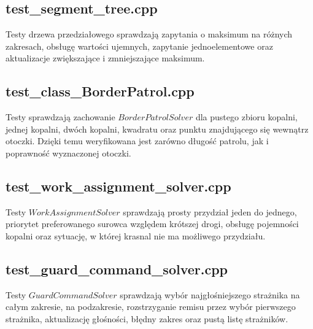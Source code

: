 \documentclass{article}
\begin{document}
\subsection{test\_segment\_tree.cpp}
Testy drzewa przedziałowego sprawdzają zapytania o maksimum na różnych zakresach, obsługę wartości ujemnych, zapytanie jednoelementowe oraz aktualizacje zwiększające i zmniejszające maksimum.


\subsection{test\_class\_BorderPatrol.cpp}
Testy sprawdzają zachowanie $BorderPatrolSolver$ dla pustego zbioru kopalni, jednej kopalni, dwóch kopalni, kwadratu oraz punktu znajdującego się wewnątrz otoczki. Dzięki temu weryfikowana jest zarówno długość patrolu, jak i poprawność wyznaczonej otoczki.


\subsection{test\_work\_assignment\_solver.cpp}
Testy $WorkAssignmentSolver$ sprawdzają prosty przydział jeden do jednego, priorytet preferowanego surowca względem krótszej drogi, obsługę pojemności kopalni oraz sytuację, w której krasnal nie ma możliwego przydziału.


\subsection{test\_guard\_command\_solver.cpp}
Testy $GuardCommandSolver$ sprawdzają wybór najgłośniejszego strażnika na całym zakresie, na podzakresie, rozstrzyganie remisu przez wybór pierwszego strażnika, aktualizację głośności, błędny zakres oraz pustą listę strażników.

\end{document}
